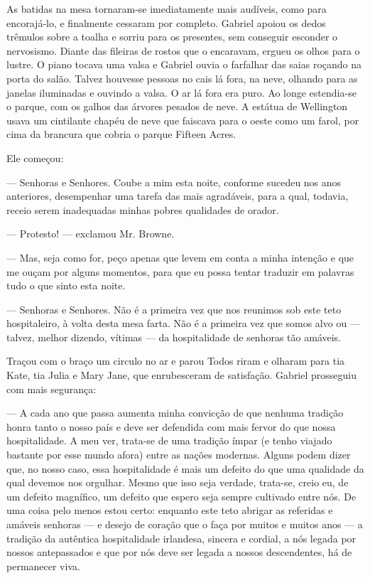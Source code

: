 As batidas na mesa tornaram-se imediatamente mais audíveis, como para
encorajá-lo, e finalmente cessaram por completo. Gabriel apoiou os
dedos trêmulos sobre a toalha e sorriu para os presentes, sem
conseguir esconder o nervosismo. Diante das
fileiras de rostos que o encaravam, ergueu os olhos para o lustre. O piano
tocava uma valsa e Gabriel ouvia o farfalhar das saias roçando na
porta do salão. Talvez houvesse pessoas no cais lá fora, na neve,
olhando para as janelas iluminadas e ouvindo a valsa. O ar lá fora era
puro. Ao longe estendia-se o parque, com os galhos das árvores pesados
de neve. A estátua de Wellington usava um cintilante chapéu de neve
que faiscava para o oeste como um farol, por cima da brancura que
cobria o parque Fifteen Acres.

Ele começou:

--- Senhoras e Senhores. Coube a mim esta noite, conforme sucedeu nos
anos anteriores, desempenhar uma tarefa das mais agradáveis, para a
qual, todavia, receio serem inadequadas minhas pobres qualidades de
orador.

--- Protesto! --- exclamou Mr. Browne.

--- Mas, seja como for, peço apenas que levem em conta a minha
intenção e que me ouçam por alguns momentos, para que eu possa tentar
traduzir em palavras tudo o que sinto esta noite.

--- Senhoras e Senhores. Não é a primeira vez que nos reunimos sob este
teto hospitaleiro, à volta desta mesa farta. Não é a primeira vez
que somos alvo ou --- talvez, melhor dizendo, vítimas --- da
hospitalidade de senhoras tão amáveis.

Traçou com o braço um circulo no ar e parou Todos riram e olharam para
tia Kate, tia Julia e Mary Jane, que enrubesceram de satisfação.
Gabriel prosseguiu com mais segurança:

--- A cada ano que passa aumenta minha convicção de que nenhuma
tradição honra tanto o nosso país e deve ser defendida com mais fervor
do que nossa hospitalidade. A meu ver, trata-se de uma tradição ímpar
(e tenho viajado bastante por esse mundo afora) entre as nações
modernas. Alguns podem dizer que, no nosso caso, essa hospitalidade é
mais um defeito do que uma qualidade da qual devemos nos orgulhar.
Mesmo que isso seja verdade, trata-se, creio eu, de um defeito
magnífico, um defeito que espero seja sempre cultivado entre nós. De
uma coisa pelo menos estou certo: enquanto este teto abrigar as
referidas e amáveis senhoras --- e desejo de coração que o faça por
muitos e muitos anos --- a tradição da autêntica hospitalidade
irlandesa, sincera e
cordial, a nós legada por nossos antepassados e que por nós deve ser
legada a nossos descendentes, há de permanecer viva.

